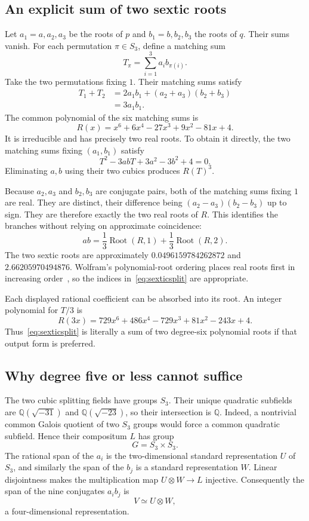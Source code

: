 \documentclass[11pt,letterpaper]{article}
\theoremstyle{definition}\newtheorem{definition}[theorem]{Definition}
\theoremstyle{remark}\newtheorem{remark}[theorem]{Remark}
\newcommand{\Q}{\mathbb Q}
\begin{document}
\subsection{An explicit sum of two sextic roots}
Let $a_1=a,a_2,a_3$ be the roots of $p$ and $b_1=b,b_2,b_3$ the roots of $q$. Their sums vanish. For each permutation $\pi\in S_3$, define a matching sum
\[
 T_\pi=\sum_{i=1}^3a_i b_{\pi(i)}.
\]
Take the two permutations fixing $1$. Their matching sums satisfy
\begin{align*}
 T_1+T_2
 &=2a_1b_1+(a_2+a_3)(b_2+b_3)\\
 &=3a_1b_1.
\end{align*}
The common polynomial of the six matching sums is
\begin{equation}
 R(x)=x^6+6x^4-27x^3+9x^2-81x+4.
 \label{eq:sextic}
\end{equation}
It is irreducible and has precisely two real roots. To obtain it directly, the two matching sums fixing $(a_1,b_1)$ satisfy
\begin{equation}
 T^2-3abT+3a^2-3b^2+4=0.
 \label{eq:matchingquadratic}
\end{equation}
Eliminating $a,b$ using their two cubics produces $R(T)^3$.

Because $a_2,a_3$ and $b_2,b_3$ are conjugate pairs, both of the matching sums fixing $1$ are real. They are distinct, their difference being $(a_2-a_3)(b_2-b_3)$ up to sign. They are therefore exactly the two real roots of $R$. This identifies the branches without relying on approximate coincidence:
\begin{equation}
 ab=\frac13\operatorname{Root}(R,1)+\frac13\operatorname{Root}(R,2).
 \label{eq:sexticsplit}
\end{equation}
The two sextic roots are approximately $0.0496159784262872$ and $2.66205970494876$. Wolfram's polynomial-root ordering places real roots first in increasing order~\cite{root}, so the indices in~\eqref{eq:sexticsplit} are appropriate.

Each displayed rational coefficient can be absorbed into its root. An integer polynomial for $T/3$ is
\[
 R(3x)=729x^6+486x^4-729x^3+81x^2-243x+4.
\]
Thus~\eqref{eq:sexticsplit} is literally a sum of two degree-six polynomial roots if that output form is preferred.

\subsection{Why degree five or less cannot suffice}
The two cubic splitting fields have groups $S_3$. Their unique quadratic subfields are $\Q(\sqrt{-31})$ and $\Q(\sqrt{-23})$, so their intersection is $\Q$. Indeed, a nontrivial common Galois quotient of two $S_3$ groups would force a common quadratic subfield. Hence their compositum $L$ has group
\[
 G=S_3\times S_3.
\]
The rational span of the $a_i$ is the two-dimensional standard representation $U$ of $S_3$, and similarly the span of the $b_j$ is a standard representation $W$. Linear disjointness makes the multiplication map $U\otimes W\to L$ injective. Consequently the span of the nine conjugates $a_i b_j$ is
\[
 V\simeq U\otimes W,
\]
a four-dimensional representation.
\end{document}
